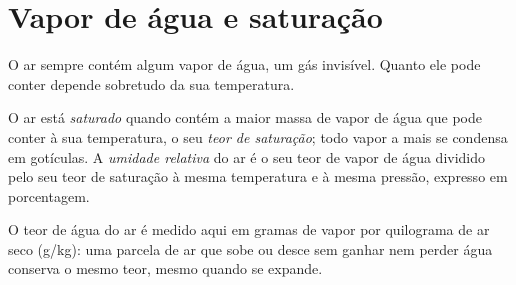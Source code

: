 \section{Vapor de água e saturação}

O ar sempre contém algum vapor de água, um gás invisível. Quanto ele pode
conter depende sobretudo da sua temperatura.

\begin{definition}\label{def:g10:why-clouds-form:humidity}
O ar está \emph{saturado} quando contém a maior
massa de vapor de água que pode conter à sua temperatura, o seu \emph{teor
de saturação}; todo vapor a mais se condensa em gotículas. A \emph{umidade
relativa} do ar é o seu teor de vapor de água
dividido pelo seu teor de saturação à mesma temperatura e à mesma pressão,
expresso em porcentagem.
\end{definition}

O teor de água do ar é medido aqui em gramas de vapor por quilograma de ar
seco (\unit{g/kg}): uma parcela de ar que sobe ou desce sem ganhar nem
perder água conserva o mesmo teor, mesmo quando se expande.

